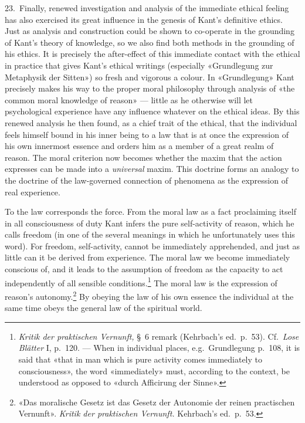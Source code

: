 \documentclass[12pt,a4paper]{article}
\begin{document}
23.\ Finally, renewed investigation and analysis of the immediate ethical
feeling has also exercised its great influence in the genesis of Kant's
definitive ethics. Just as analysis and construction could be shown to
co-operate in the grounding of Kant's theory of knowledge, so we also find
both methods in the grounding of his ethics. It is precisely the
after-effect of this immediate contact with the ethical in practice that
gives Kant's ethical writings (especially «Grundlegung zur Metaphysik der
Sitten») so fresh and vigorous a colour. In «Grundlegung» Kant precisely
makes his way to the proper moral philosophy through analysis of «the common
moral knowledge of reason» --- little as he otherwise will let psychological
experience have any influence whatever on the ethical ideas. By this renewed
analysis he then found, as a chief trait of the ethical, that the individual
feels himself bound in his inner being to a law that is at once the
expression of his own innermost essence and orders him as a member of a
great realm of reason. The moral criterion now becomes whether the maxim
that the action expresses can be made into a \emph{universal} maxim. This doctrine
forms an analogy to the doctrine of the law-governed connection of phenomena
as the expression of real experience.

To the law corresponds the force. From the moral law as a fact proclaiming
itself in all consciousness of duty Kant infers the pure self-activity of
reason, which he calls freedom (in one of the several meanings in which he
unfortunately uses this word). For freedom, self-activity, cannot be
immediately apprehended, and just as little can it be derived from
experience. The moral law we become immediately conscious of, and it leads
to the assumption of freedom as the capacity to act independently of all
sensible conditions.\footnote{\textit{Kritik der praktischen Vernunft,} §\ 6
remark (Kehrbach's ed.\ p.\ 53). Cf.\ \textit{Lose Blätter} I, p.\ 120. ---
When in individual places, e.g.\ Grundlegung p.\ 108, it is said that «that
in man which is pure activity comes immediately to consciousness», the word
«immediately» must, according to the context, be understood as opposed to
«durch Afficirung der Sinne».} The moral law is the expression of reason's
autonomy.\footnote{«Das moralische Gesetz ist das Gesetz der Autonomie der
reinen practischen Vernunft». \textit{Kritik der praktischen Vernunft.}
Kehrbach's ed.\ p.\ 53.} By obeying the law of his own essence the individual
at the same time obeys the general law of the spiritual world.
\end{document}
